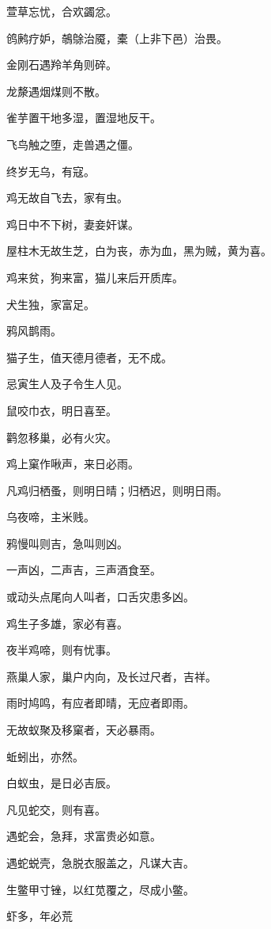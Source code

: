 \documentclass[a4paper,12pt,UTF8,twoside]{ctexbook}
\begin{document}
    萱草忘忧，合欢蠲忿。
    
    鸧鹒疗妒，鵸鵌治魇，橐（上非下邑）治畏。
    
    金刚石遇羚羊角则碎。
    
    龙漦遇烟煤则不散。
    
    雀芋置干地多湿，置湿地反干。
    
    飞鸟触之堕，走兽遇之僵。
    
    终岁无乌，有寇。
    
    鸡无故自飞去，家有虫。
    
    鸡日中不下树，妻妾奸谋。
    
    屋柱木无故生芝，白为丧，赤为血，黑为贼，黄为喜。
    
    鸡来贫，狗来富，猫儿来后开质库。
    
    犬生独，家富足。
    
    鸦风鹊雨。
    
    猫子生，值天德月德者，无不成。
    
    忌寅生人及子令生人见。
    
    鼠咬巾衣，明日喜至。
    
    鹳忽移巢，必有火灾。
    
    鸡上窠作啾声，来日必雨。
    
    凡鸡归栖蚤，则明日晴；归栖迟，则明日雨。
    
    乌夜啼，主米贱。
    
    鸦慢叫则吉，急叫则凶。
    
    一声凶，二声吉，三声酒食至。
    
    或动头点尾向人叫者，口舌灾患多凶。
    
    鸡生子多雄，家必有喜。
    
    夜半鸡啼，则有忧事。
    
    燕巢人家，巢户内向，及长过尺者，吉祥。
    
    雨时鸠鸣，有应者即晴，无应者即雨。
    
    无故蚁聚及移窠者，天必暴雨。
    
    蚯蚓出，亦然。
    
    白蚁虫，是日必吉辰。
    
    凡见蛇交，则有喜。
    
    遇蛇会，急拜，求富贵必如意。
    
    遇蛇蜕壳，急脱衣服盖之，凡谋大吉。
    
    生鳖甲寸锉，以红苋覆之，尽成小鳖。
    
    虾多，年必荒
    
\end{document}
